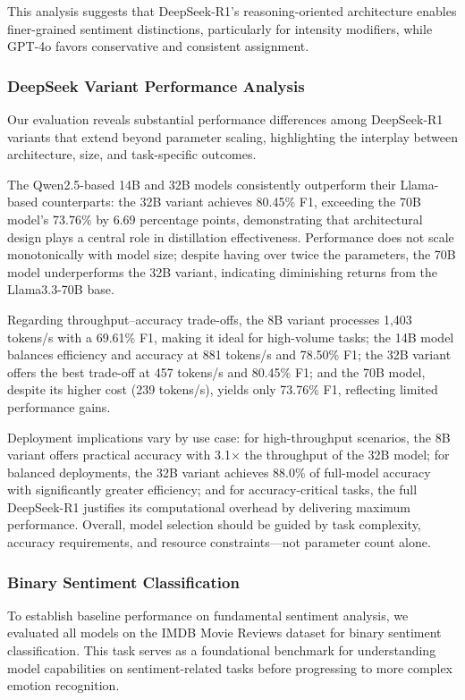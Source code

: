 \documentclass{IEEEcsmag}
\begin{document}
This analysis suggests that DeepSeek-R1’s reasoning-oriented architecture enables finer-grained sentiment distinctions, particularly for intensity modifiers, while GPT-4o favors conservative and consistent assignment.

\vspace{-15pt}
\subsubsection{\textbf{DeepSeek Variant Performance Analysis}} 

Our evaluation reveals substantial performance differences among DeepSeek-R1 variants that extend beyond parameter scaling, highlighting the interplay between architecture, size, and task-specific outcomes.

The Qwen2.5-based 14B and 32B models consistently outperform their Llama-based counterparts: the 32B variant achieves 80.45\% F1, exceeding the 70B model’s 73.76\% by 6.69 percentage points, demonstrating that architectural design plays a central role in distillation effectiveness. Performance does not scale monotonically with model size; despite having over twice the parameters, the 70B model underperforms the 32B variant, indicating diminishing returns from the Llama3.3-70B base.

Regarding throughput–accuracy trade-offs, the 8B variant processes 1,403 tokens/s with a 69.61\% F1, making it ideal for high-volume tasks; the 14B model balances efficiency and accuracy at 881 tokens/s and 78.50\% F1; the 32B variant offers the best trade-off at 457 tokens/s and 80.45\% F1; and the 70B model, despite its higher cost (239 tokens/s), yields only 73.76\% F1, reflecting limited performance gains.

Deployment implications vary by use case: for high-throughput scenarios, the 8B variant offers practical accuracy with 3.1× the throughput of the 32B model; for balanced deployments, the 32B variant achieves 88.0\% of full-model accuracy with significantly greater efficiency; and for accuracy-critical tasks, the full DeepSeek-R1 justifies its computational overhead by delivering maximum performance. Overall, model selection should be guided by task complexity, accuracy requirements, and resource constraints—not parameter count alone.

\vspace{-15pt}
\subsubsection{\textbf{Binary Sentiment Classification}}
To establish baseline performance on fundamental sentiment analysis, we evaluated all models on the IMDB Movie Reviews dataset for binary sentiment classification. This task serves as a foundational benchmark for understanding model capabilities on sentiment-related tasks before progressing to more complex emotion recognition.
\end{document}

